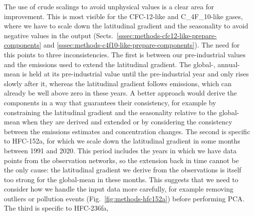 The use of crude scalings to avoid unphysical values is a clear area for improvement.
This is most visible for the CFC-12-like and C_4F_10-like gases,
where we have to scale down the latitudinal gradient and the seasonality to avoid negative values in the output
(Sects.~\ref{sssec:methods-cfc12-like-prepare-components} and \ref{sssec:methods-c4f10-like-prepare-components}).
The need for this points to three inconsistencies.
The first is between our pre-industrial values and the emissions used to extend the latitudinal gradient.
The global-, annual-mean is held at its pre-industrial value until the pre-industrial year and only rises slowly after it,
whereas the latitudinal gradient follows emissions, which can already be well above zero in these years.
A better approach would derive the components in a way that guarantees their consistency,
for example by constraining the latitudinal gradient and the seasonality relative to the global-mean when they are derived and extended
or by considering the consistency between the emissions estimates and concentration changes.
The second is specific to HFC-152a,
for which we scale down the latitudinal gradient in some months between 1991 and 2020.
This period includes the years in which we have data points from the observation networks,
so the extension back in time cannot be the only cause:
the latitudinal gradient we derive from the observations is itself too strong for the global-mean in these months.
This suggests that we need to consider how we handle the input data more carefully,
for example removing outliers or pollution events (Fig.~\ref{fig:methods-hfc152a}) before performing PCA.
The third is specific to HFC-236fa,
